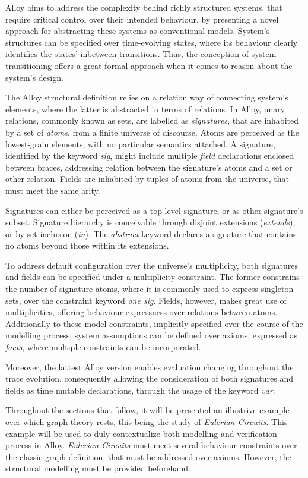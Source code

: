Alloy aims to address the complexity behind richly structured systems, that require critical control over their intended behaviour, by presenting a novel approach for abstracting these systems as conventional models. System's structures can be specified over time-evolving states, where its behaviour clearly identifies the states' inbetween transitions. Thus, the conception of system transitioning offers a great formal approach when it comes to reason about the system's design.

The Alloy structural definition relies on a relation way of connecting system's elements, where the latter is abstracted in terms of relations. In Alloy, unary relations, commonly known as sets, are labelled as \textit{signatures}, that are inhabited by a set of \textit{atoms}, from a finite universe of discourse. Atoms are perceived as the lowest-grain elements, with no particular semantics attached. A signature, identified by the keyword \textit{sig}, might include multiple \textit{field} declarations enclosed between braces, addressing relation between the signature's atoms and a set or other relation. Fields are inhabited by tuples of atoms from the universe, that must meet the same arity.

Signatures can either be perceived as a top-level signature, or as other signature's subset. Signature hierarchy is conceivable through disjoint extensions (\textit{extends}), or by set inclusion (\textit{in}). The \textit{abstract} keyword declares a signature that contains no atoms beyond those within its extensions. 

To address default configuration over the universe's multiplicity, both signatures and fields can be specified under a multiplicity constraint. The former constrains the number of signature atoms, where it is commonly used to express singleton sets, over the constraint keyword \textit{one sig}. Fields, however, makes great use of multiplicities, offering behaviour expressness over relations between atoms. Additionally to these model constraints, implicitly specified over the course of the modelling process, system assumptions can be defined over axioms, expressed as \textit{facts}, where multiple constraints can be incorporated.

Moreover, the lattest Alloy version enables evaluation changing throughout the trace evolution, consequently allowing the consideration of both signatures and fields as time mutable declarations, through the usage of the keyword \textit{var}.

Throughout the sections that follow, it will be presented an illustrive example over which graph theory rests, this being the study of \textit{Eulerian Circuits}. This example will be used to duly contextualize both modelling and verification process in Alloy. \textit{Eulerian Circuits} must meet several behaviour constraints over the classic graph definition, that must be addressed over axioms. However, the structural modelling must be provided beforehand.

